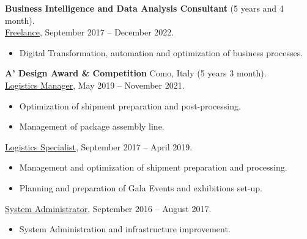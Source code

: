 \documentclass[a4paper,10pt,fullpage]{article}
\begin{document}
\textbf{Business Intelligence and Data Analysis  Consultant} (5 years and 4 month).\\
\underline{Freelance}, September 2017 -- December 2022.
\begin{itemize}
	\item[--] Digital Transformation, automation and optimization of business processes.\\
\end{itemize}

\textbf{A' Design Award \& Competition} Como, Italy (5 years 3 month).\\
\underline{Logistics Manager}, May 2019 -- November 2021.
\begin{itemize}
	\item[--] Optimization of shipment preparation and post-processing.
	\item[--] Management of package assembly line.
\end{itemize}
\underline{Logistics Specialist}, September 2017 -- April 2019.
\begin{itemize}	
	\item[--] Management and optimization of shipment preparation and processing. 
	\item[--] Planning and preparation of Gala Events and exhibitions set-up.
\end{itemize}
\underline{System Administrator}, September 2016 -- August 2017.
\begin{itemize}
	\item[--] System Administration and infrastructure improvement.\\
\end{itemize}
\end{document}
